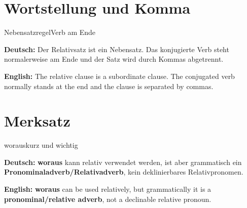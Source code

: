 \documentclass[a4paper,11pt]{article}
\newcommand{\GermanText}[1]{\textbf{Deutsch: }#1\par}
\newcommand{\EnglishText}[1]{{\small\color{SoftGray}\textbf{English: }#1\par}}
\begin{document}
\section{Wortstellung und Komma}

\begin{grammarentry}{Nebensatzregel}{Verb am Ende}

\GermanText{Der Relativsatz ist ein Nebensatz. Das konjugierte Verb steht normalerweise am Ende und der Satz wird durch Kommas abgetrennt.}

\EnglishText{The relative clause is a subordinate clause. The conjugated verb normally stands at the end and the clause is separated by commas.}

\end{grammarentry}

\section{Merksatz}

\begin{grammarentry}{woraus}{kurz und wichtig}

\GermanText{\textbf{woraus} kann relativ verwendet werden, ist aber grammatisch ein \textbf{Pronominaladverb/Relativadverb}, kein deklinierbares Relativpronomen.}

\EnglishText{\textbf{woraus} can be used relatively, but grammatically it is a \textbf{pronominal/relative adverb}, not a declinable relative pronoun.}

\end{grammarentry}
\end{document}
